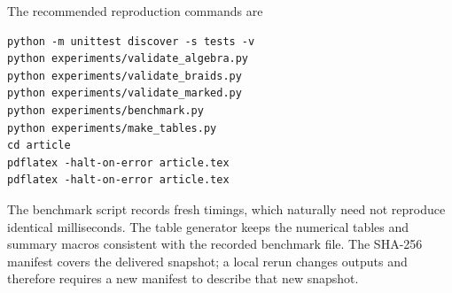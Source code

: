 \documentclass[11pt,letterpaper]{article}
\theoremstyle{definition}
\theoremstyle{remark}
\begin{document}
The recommended reproduction commands are
\begin{lstlisting}
python -m unittest discover -s tests -v
python experiments/validate_algebra.py
python experiments/validate_braids.py
python experiments/validate_marked.py
python experiments/benchmark.py
python experiments/make_tables.py
cd article
pdflatex -halt-on-error article.tex
pdflatex -halt-on-error article.tex
\end{lstlisting}
The benchmark script records fresh timings, which naturally need not reproduce
identical milliseconds. The table generator keeps the numerical tables and
summary macros consistent with the recorded benchmark file. The SHA-256
manifest covers the delivered snapshot; a local rerun changes outputs and
therefore requires a new manifest to describe that new snapshot.
\end{document}
